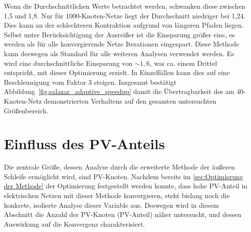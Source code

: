 Wenn die Durchschnittlichen Werte betrachtet werden, schwanken diese zwischen 1,5 und 1,8.
Nur für 1000-Knoten-Netze liegt der Durchschnitt niedriger bei 1,24.
Dies kann an der schlechteren Kontraktion aufgrund von längeren Pfaden liegen.
Selbst unter Berücksichtigung der Ausreißer ist die Einsparung größer eins, es werden als für alle konvergierende Netze Iterationen eingespart.
Diese Methode kann deswegen als Standard für alle weiteren Analysen verwendet werden.
Es wird eine durchschnittliche Einsparung von $\sim1,6$, was ca. einem Drittel entspricht, mit dieser Optimierung erzielt.
In Einzelfällen kann dies auf eine Beschleunigung vom Faktor 3 steigen.
%
Insgesamt bestätigt
Abbildung~\ref{fig:salazar_adaptive_speedup} damit die Übertragbarkeit des am
40-Knoten-Netz demonstrierten Verhaltens auf den gesamten untersuchten
Größenbereich.




\section{Einfluss des PV-Anteils}
\label{sec:pv-share-invarianz}


Die zentrale Größe, dessen Analyse durch die erweiterte Methode der äußeren Schleife ermöglicht wird, sind PV-Knoten.
Nachdem bereits im \cref{sec:Optimierung der Methode} der Optimierung festgestellt werden konnte, dass hohe PV-Anteil in elektrischen Netzen mit dieser Methode konvergieren, steht bislang noch die konkrete, isolierte Analyse dieser Variable aus.
Deswegen wird in diesem Abschnitt die Anzahl der PV-Knoten (PV-Anteil) näher untersucht, und dessen Auswirkung auf die Konvergenz charakterisiert.\\

